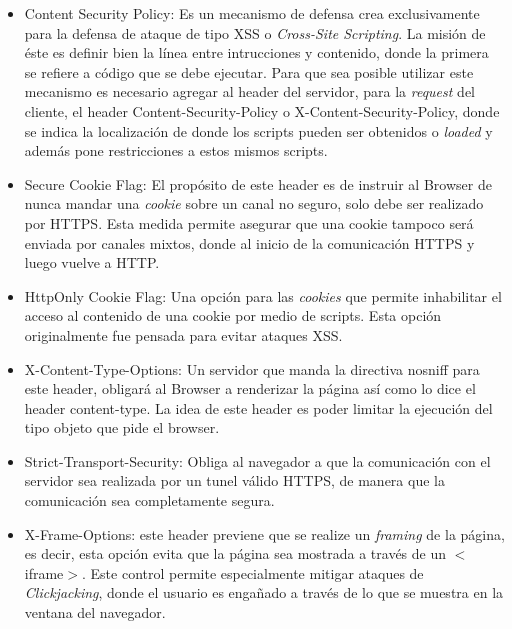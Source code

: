             \begin{itemize}
                \item Content Security Policy: Es un mecanismo de defensa crea exclusivamente para la defensa de ataque de tipo XSS o \textit{Cross-Site Scripting}. La misión de éste es definir bien la línea entre intrucciones y contenido, donde la primera se refiere a código que se debe ejecutar. Para que sea posible utilizar este mecanismo es necesario agregar al header del servidor, para la \textit{request} del cliente, el header Content-Security-Policy o X-Content-Security-Policy, donde se indica la localización de donde los scripts pueden ser obtenidos o \textit{loaded} y además pone restricciones a estos mismos scripts.

                \item Secure Cookie Flag: El propósito de este header es de instruir al Browser de nunca mandar una \textit{cookie} sobre un canal no seguro, solo debe ser realizado por HTTPS. Esta medida permite asegurar que una cookie tampoco será enviada por canales mixtos, donde al inicio de la comunicación HTTPS y luego vuelve a HTTP.

                \item HttpOnly Cookie Flag: Una opción para las \textit{cookies} que permite inhabilitar el acceso al contenido de una cookie por medio de scripts. Esta opción originalmente fue pensada para evitar ataques XSS.

                \item X-Content-Type-Options: Un servidor que manda la directiva nosniff para este header, obligará al Browser a renderizar la página así como lo dice el header content-type. La idea de este header es poder limitar la ejecución del tipo objeto que pide el browser.

                \item Strict-Transport-Security: Obliga al navegador a que la comunicación con el servidor sea realizada por un tunel válido HTTPS, de manera que la comunicación sea completamente segura.

                \item X-Frame-Options: este header previene que se realize un \textit{framing} de la página, es decir, esta opción evita que la página sea mostrada a través de un \(<\)iframe\(>\). Este control permite especialmente mitigar ataques de \textit{Clickjacking}, donde el usuario es engañado a través de lo que se muestra en la ventana del navegador.
            \end{itemize}

